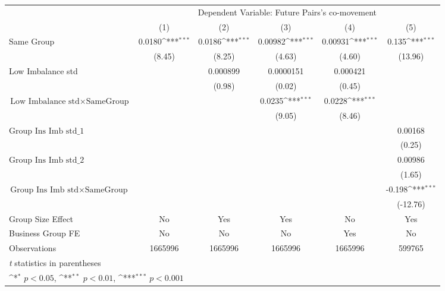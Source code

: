 {
\def\sym#1{\ifmmode^{#1}\else\(^{#1}\)\fi}
\begin{tabular}{l*{5}{c}}
\hline\hline
                &\multicolumn{5}{c}{Dependent Variable: Future Pairs's co-movement}                            \\\cmidrule(lr){2-6}
                &\multicolumn{1}{c}{(1)}         &\multicolumn{1}{c}{(2)}         &\multicolumn{1}{c}{(3)}         &\multicolumn{1}{c}{(4)}         &\multicolumn{1}{c}{(5)}         \\
\hline
Same Group      &   0.0180\sym{***}&   0.0186\sym{***}&  0.00982\sym{***}&  0.00931\sym{***}&    0.135\sym{***}\\
                &   (8.45)         &   (8.25)         &   (4.63)         &   (4.60)         &  (13.96)         \\
[1em]
Low Imbalance std&                  & 0.000899         &0.0000151         & 0.000421         &                  \\
                &                  &   (0.98)         &   (0.02)         &   (0.45)         &                  \\
[1em]
 $ \text{Low Imbalance std} \times {\text{SameGroup} } $ &                  &                  &   0.0235\sym{***}&   0.0228\sym{***}&                  \\
                &                  &                  &   (9.05)         &   (8.46)         &                  \\
[1em]
 $ {\text{Group Ins Imb std}\_1} $ &                  &                  &                  &                  &  0.00168         \\
                &                  &                  &                  &                  &   (0.25)         \\
[1em]
 $ {\text{Group Ins Imb std}\_2} $ &                  &                  &                  &                  &  0.00986         \\
                &                  &                  &                  &                  &   (1.65)         \\
[1em]
$ {\text{Group Ins Imb std} } \times {\text{SameGroup} }  $ &                  &                  &                  &                  &   -0.198\sym{***}\\
                &                  &                  &                  &                  & (-12.76)         \\
\hline
Group Size Effect&       No         &      Yes         &      Yes         &       No         &      Yes         \\
Business Group FE&       No         &       No         &       No         &      Yes         &       No         \\
Observations    &  1665996         &  1665996         &  1665996         &  1665996         &   599765         \\
\hline\hline
\multicolumn{6}{l}{\footnotesize \textit{t} statistics in parentheses}\\
\multicolumn{6}{l}{\footnotesize \sym{*} \(p<0.05\), \sym{**} \(p<0.01\), \sym{***} \(p<0.001\)}\\
\end{tabular}
}
